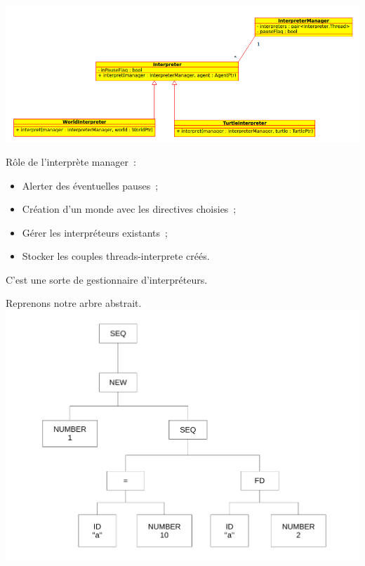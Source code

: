 
\begin{frame}
\includegraphics[scale=0.3]{doc/report/uml/interpreterUML.png}
\end{frame}

\begin{frame}
Rôle de l'interprète manager~:
\begin{itemize}
	\item Alerter des éventuelles pauses~;
	\item Création d'un monde avec les directives choisies~;
	\item Gérer les interpréteurs existants~;
	\item Stocker les couples threads-interprete créés.
\end{itemize}
C'est une sorte de gestionnaire d'interpréteurs.
\end{frame}

\begin{frame}
Reprenons notre arbre abstrait.
\includegraphics[scale=0.3]{doc/Presentation/img/arbre.pdf}
\end{frame}

